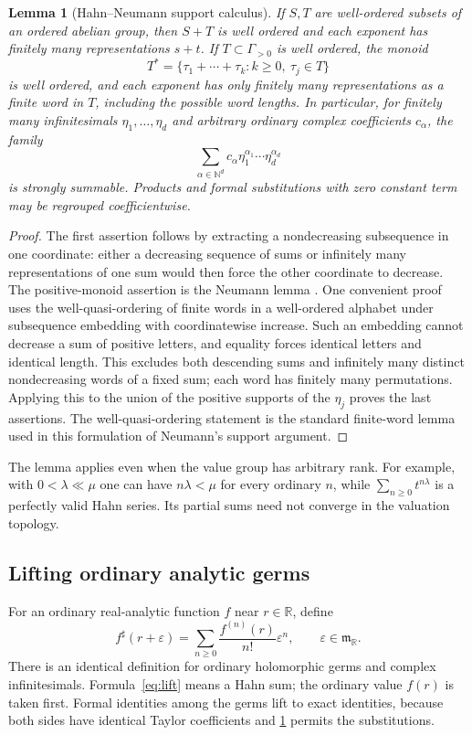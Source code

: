 \documentclass[11pt]{article}
\numberwithin{equation}{section}
\newtheorem{lemma}[theorem]{Lemma}
\theoremstyle{definition}
\newcommand{\R}{\mathbb R}
\newcommand{\N}{\mathbb N}
\newcommand{\mm}{\mathfrak m}
\newcommand{\eps}{\varepsilon}
\newcommand{\sh}{^{\sharp}}
\begin{document}
\begin{lemma}[Hahn--Neumann support calculus]\label{lem:support}
If $S,T$ are well-ordered subsets of an ordered abelian group, then $S+T$ is well ordered and each exponent has finitely many representations $s+t$. If $T\subset\Gamma_{>0}$ is well ordered, the monoid
\[
 T^*=\{\tau_1+\cdots+\tau_k:k\ge0,\ \tau_j\in T\}
\]
is well ordered, and each exponent has only finitely many representations as a finite word in $T$, including the possible word lengths. In particular, for finitely many infinitesimals $\eta_1,\ldots,\eta_d$ and arbitrary ordinary complex coefficients $c_\alpha$, the family
\[
 \sum_{\alpha\in\N^d}c_\alpha\eta_1^{\alpha_1}\cdots\eta_d^{\alpha_d}
\]
is strongly summable. Products and formal substitutions with zero constant term may be regrouped coefficientwise.
\end{lemma}
\begin{proof}
The first assertion follows by extracting a nondecreasing subsequence in one coordinate: either a decreasing sequence of sums or infinitely many representations of one sum would then force the other coordinate to decrease. The positive-monoid assertion is the Neumann lemma \cite{Neumann}. One convenient proof uses the well-quasi-ordering of finite words in a well-ordered alphabet under subsequence embedding with coordinatewise increase. Such an embedding cannot decrease a sum of positive letters, and equality forces identical letters and identical length. This excludes both descending sums and infinitely many distinct nondecreasing words of a fixed sum; each word has finitely many permutations. Applying this to the union of the positive supports of the $\eta_j$ proves the last assertions. The well-quasi-ordering statement is the standard finite-word lemma used in this formulation of Neumann's support argument.
\end{proof}

The lemma applies even when the value group has arbitrary rank. For example, with $0<\lambda\ll\mu$ one can have $n\lambda<\mu$ for every ordinary $n$, while $\sum_{n\ge0}t^{n\lambda}$ is a perfectly valid Hahn series. Its partial sums need not converge in the valuation topology.

\subsection{Lifting ordinary analytic germs}
For an ordinary real-analytic function $f$ near $r\in\R$, define
\begin{equation}\label{eq:lift}
 f\sh(r+\eps)=\sum_{n\ge0}\frac{f^{(n)}(r)}{n!}\eps^n,
 \qquad \eps\in\mm_{\R}.
\end{equation}
There is an identical definition for ordinary holomorphic germs and complex infinitesimals. Formula~\eqref{eq:lift} means a Hahn sum; the ordinary value $f(r)$ is taken first. Formal identities among the germs lift to exact identities, because both sides have identical Taylor coefficients and \cref{lem:support} permits the substitutions.
\end{document}
